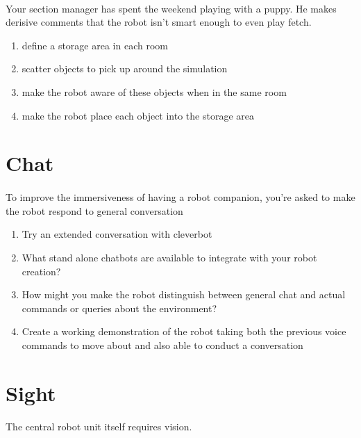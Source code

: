 \documentclass[11pt]{book}
\begin{document}
\paragraph{} Your section manager has spent the weekend playing with a puppy. He makes derisive comments that the robot isn't smart enough to even play fetch.

\begin{enumerate}
\item define a storage area in each room
\item scatter objects to pick up around the simulation
\item make the robot aware of these objects when in the same room
\item make the robot place each object into the storage area
\end{enumerate}

\clearpage

\section{Chat}

\paragraph{} To improve the immersiveness of having a robot companion, you're asked to make the robot respond to general conversation

\begin{enumerate}
\item Try an extended conversation with cleverbot
\item What stand alone chatbots are available to integrate with your robot creation?
\item How might you make the robot distinguish between general chat and actual commands or queries about the environment?
\item Create a working demonstration of the robot taking both the previous voice commands to move about and also able to conduct a conversation
\end{enumerate}

\section{Sight}

\paragraph{} The central robot unit itself requires vision. 
\end{document}
